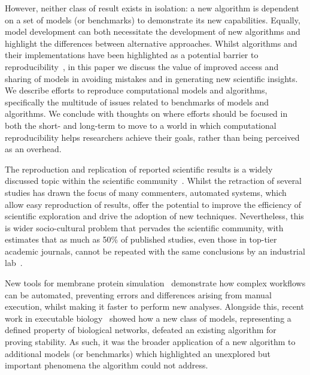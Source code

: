 \documentclass[conference]{IEEEtran}
\begin{document}
However, neither class of result exists in isolation: a new algorithm is
dependent on a set of models (or benchmarks) to demonstrate its new
capabilities. Equally, model development can both necessitate the
development of new algorithms and highlight the differences between
alternative approaches. Whilst algorithms and their implementations
have been highlighted as a potential barrier to
reproducibility~\cite{crick-et-al_wssspe2}, in this paper we discuss the value
of improved access and sharing of models in avoiding mistakes and in
generating new scientific insights. We describe efforts to reproduce
computational models and algorithms, specifically the multitude of issues
related to benchmarks of models and algorithms. 
We conclude with thoughts %
on where efforts should be focused in both the short- and
long-term to move to a world in which computational reproducibility
helps researchers achieve their goals, rather than being perceived as
an overhead.


The reproduction and replication of reported scientific results is a
widely discussed topic within the scientific
community~\cite{barnes:2010,morin-et-al:2012,joppa-et-al:2013}.
Whilst the retraction of several studies has drawn the focus of many
commenters, automated systems, which allow easy reproduction of
results, offer the potential to improve the efficiency of scientific
exploration and drive the adoption of new techniques. Nevertheless,
this is wider socio-cultural problem that pervades the scientific
community, with estimates that as much as 50\% of published studies,
even those in top-tier academic journals, cannot be repeated with the
same conclusions by an industrial lab~\cite{osherovich:2011}.

New tools for membrane protein simulation~\cite{Stansfeld,Hall2014}
demonstrate how complex workflows can be automated, preventing errors
and differences arising from manual execution, whilst making it faster
to perform new analyses.  Alongside this, recent work in executable
biology~\cite{Cook} showed how a new class of models, representing a
defined property of biological networks, defeated an existing
algorithm for proving stability. As such, it was the broader
application of a new algorithm to additional models (or benchmarks)
which highlighted an unexplored but important phenomena the algorithm
could not address.
\end{document}
